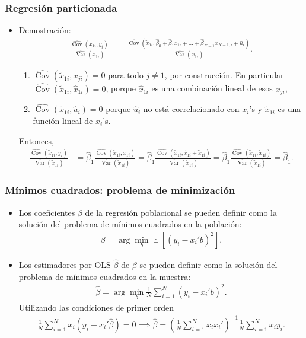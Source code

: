 \documentclass[t, compress, spanish, aspectratio=169]{beamer}
\DeclareMathOperator{\Var}{Var}
\DeclareMathOperator{\Cov}{Cov}
\DeclareMathOperator{\E}{\mathbb{E}}
\begin{document}
	\begin{frame}
		\frametitle{Regresi\'on particionada}
		\begin{itemize}
			\item <1-> Demostraci\'on: 
			\begin{align*}
				\frac{\widehat{\Cov}(\tilde x_{1i},y_i)}{\widehat{\Var}(\tilde x_{1i})}
					& = \frac{\widehat{\Cov}(\tilde x_{1i},\hat\beta_0+\hat\beta_1x_{1i}+...+\hat\beta_{K-1} x_{K-1,i}+ \hat u_i)}{\widehat{\Var}(\tilde x_{1i})}.
			\end{align*}
			\begin{enumerate}
				\item[(1)] $\widehat{\Cov}(\tilde x_{1i},x_{ji})=0$ para todo $j\neq 1$, por construcci\'on. En particular $\widehat{\Cov}(\tilde x_{1i},\hat x_{1i})=0$, porque $\hat x_{1i}$ es una combinaci\'on lineal de esos $x_{ji}$,
				\item[(2)] $\widehat{\Cov}(\tilde x_{1i},\hat u_i)=0$ porque $\hat u_i$ no est\'a correlacionado con $x_i$'s y $\tilde x_{1i}$ es una funci\'on lineal de $x_i$'s.
			\end{enumerate}
			Entonces,
			\small
			\begin{align*}
				\frac{\widehat{\Cov}(\tilde x_{1i},y_{i})}{\widehat{\Var}(\tilde x_{1i})} & = \hat \beta_1\frac{\widehat{\Cov}(\tilde x_{1i},x_{1i})}{\widehat{\Var}(\tilde x_{1i})}
				= \hat \beta_1\frac{\widehat{\Cov}(\tilde x_{1i},\hat x_{1i}+\tilde x_{1i})}{\widehat{\Var}(\tilde x_{1i})}
				= \hat \beta_1\frac{\widehat{\Cov}(\tilde x_{1i},\tilde x_{1i})}{\widehat{\Var}(\tilde x_{1i})}=\hat \beta_1.
			\end{align*}
		\end{itemize}
	\end{frame}
	\begin{frame}[shrink=6]
		\frametitle{M\'inimos cuadrados: problema de minimizaci\'on}
		\begin{itemize}
			\item  Los coeficientes $\beta$ de la regresi\'on poblacional se pueden definir como la soluci\'on del problema de m\'inimos cuadrados en la poblaci\'on:
			\begin{align*}
				\beta = \arg \min_b \E[(y_i-x_i'b)^2].
			\end{align*}
			\item Los estimadores por OLS $\hat \beta $ de $\beta$ se pueden definir como la soluci\'on del problema de m\'inimos cuadrados en la muestra:
			\begin{align*}
				\hat \beta = \arg \min_b \frac{1}{N}\sum_{i=1}^{N}(y_i-x_i'b)^2.  
			\end{align*}
			\bigskip
			Utilizando las condiciones de primer orden
			\begin{align*}
				\frac{1}{N}\sum_{i=1}^{N} x_i(y_i-x_i'\hat \beta)=0 \implies \hat \beta= \left(\frac{1}{N}\sum_{i=1}^{N} x_ix_i'\right)^{-1}\frac{1}{N}\sum_{i=1}^{N}x_i y_i.
			\end{align*}
		\end{itemize}
	\end{frame}
%
		
\end{document}
